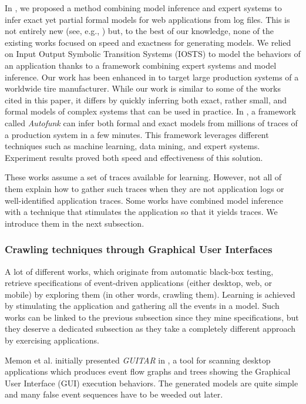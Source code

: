 In \cite{DBLP:conf/soict/DurandS14}, we proposed a method
combining model inference and expert systems to infer exact yet
partial formal models for web applications from log files. This
is not entirely new (see, e.g.,
\cite{Andrews00broad-spectrumstudies,4700316}) but, to the best of
our knowledge, none of the existing works focused on speed and
exactness for generating models. We relied on Input Output
Symbolic Transition Systems (IOSTS) \cite{FTW05} to model the
behaviors of an application thanks to a framework combining
expert systems and model inference. Our work has been enhanced
in \cite{DBLP:conf/debs/SalvaD15} to target large production
systems of a worldwide tire manufacturer. While our work is
similar to some of the works cited in this paper, it differs by
quickly inferring both exact, rather small, and formal models of
complex systems that can be used in practice. In
\cite{DBLP:conf/debs/SalvaD15}, a framework called
\textit{Autofunk} can infer both formal and exact models from
millions of traces of a production system in a few minutes. This
framework leverages different techniques such as machine
learning, data mining, and expert systems. Experiment results
proved both speed and effectiveness of this solution.

These works assume a set of traces available for learning.
However, not all of them explain how to gather such traces when
they are not application logs or well-identified application
traces. Some works have combined model inference with a technique
that stimulates the application so that it yields traces. We
introduce them in the next subsection.

\subsubsection{Crawling techniques through Graphical User
Interfaces}
\label{sec:related:modelinf:passive-crawling}

A lot of different works, which originate from automatic
black-box testing, retrieve specifications of event-driven
applications (either desktop, web, or mobile) by exploring them
(in other words, crawling them). Learning is achieved by
stimulating the application and gathering all the events in a
model. Such works can be linked to the previous subsection since
they mine specifications, but they deserve a dedicated subsection as
they take a completely different approach by exercising
applications.

Memon et al. initially presented \textit{GUITAR} in
\cite{Memon:2003}, a tool for scanning desktop applications which
produces event flow graphs and trees showing the Graphical User
Interface (GUI) execution behaviors. The generated models are
quite simple and many false event sequences have to be weeded out
later.

